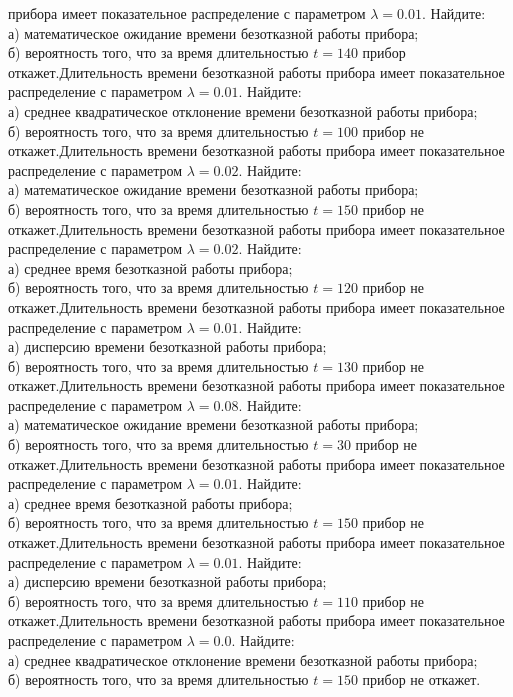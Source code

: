 прибора имеет показательное распределение с параметром $\lambda = 0.01$. Найдите: \\ \quad а) математическое ожидание времени безотказной работы прибора; \\ \quad б) вероятность того, что за время длительностью $t = 140$ прибор откажет.Длительность времени безотказной работы прибора имеет показательное распределение с параметром $\lambda = 0.01$. Найдите: \\ \quad а) среднее квадратическое отклонение времени безотказной работы прибора; \\ \quad б) вероятность того, что за время длительностью $t = 100$ прибор не откажет.Длительность времени безотказной работы прибора имеет показательное распределение с параметром $\lambda = 0.02$. Найдите: \\ \quad а) математическое ожидание времени безотказной работы прибора; \\ \quad б) вероятность того, что за время длительностью $t = 150$ прибор не откажет.Длительность времени безотказной работы прибора имеет показательное распределение с параметром $\lambda = 0.02$. Найдите: \\ \quad а) среднее время безотказной работы прибора; \\ \quad б) вероятность того, что за время длительностью $t = 120$ прибор не откажет.Длительность времени безотказной работы прибора имеет показательное распределение с параметром $\lambda = 0.01$. Найдите: \\ \quad а) дисперсию времени безотказной работы прибора; \\ \quad б) вероятность того, что за время длительностью $t = 130$ прибор не откажет.Длительность времени безотказной работы прибора имеет показательное распределение с параметром $\lambda = 0.08$. Найдите: \\ \quad а) математическое ожидание времени безотказной работы прибора; \\ \quad б) вероятность того, что за время длительностью $t = 30$ прибор не откажет.Длительность времени безотказной работы прибора имеет показательное распределение с параметром $\lambda = 0.01$. Найдите: \\ \quad а) среднее время безотказной работы прибора; \\ \quad б) вероятность того, что за время длительностью $t = 150$ прибор не откажет.Длительность времени безотказной работы прибора имеет показательное распределение с параметром $\lambda = 0.01$. Найдите: \\ \quad а) дисперсию времени безотказной работы прибора; \\ \quad б) вероятность того, что за время длительностью $t = 110$ прибор не откажет.Длительность времени безотказной работы прибора имеет показательное распределение с параметром $\lambda = 0.0$. Найдите: \\ \quad а) среднее квадратическое отклонение времени безотказной работы прибора; \\ \quad б) вероятность того, что за время длительностью $t = 150$ прибор не откажет. 

